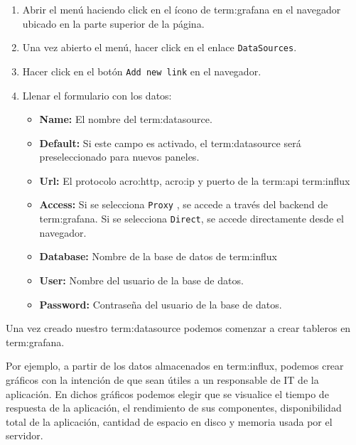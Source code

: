 \begin{enumerate}
  \item Abrir el menú haciendo click en el ícono de \gls{term:grafana} en el
  navegador ubicado en la parte superior de la página.

  \item Una vez abierto el menú, hacer click en el enlace \texttt{DataSources}.
  \item Hacer click en el botón \texttt{Add new link} en el navegador.
  \item Llenar el formulario con los datos:
    \begin{itemize}
      \item \textbf{Name:}
      El nombre del \gls{term:datasource}.

      \item \textbf{Default:}
      Si este campo es activado, el \gls{term:datasource} será preseleccionado
      para nuevos paneles.

      \item \textbf{Url:}
      El protocolo \gls{acro:http}, \gls{acro:ip} y puerto de la \gls{term:api}
      \gls{term:influx}

      \item \textbf{Access:}
      Si se selecciona \texttt{Proxy} , se accede a través del backend de \gls{term:grafana}.
      Si se selecciona \texttt{Direct}, se accede directamente desde el navegador.

      \item \textbf{Database:}
      Nombre de la base de datos de \gls{term:influx}

      \item \textbf{User:}
      Nombre del usuario de la base de datos.

      \item \textbf{Password:}
      Contraseña del usuario de la base de datos.

    \end{itemize}
\end{enumerate}

Una vez creado nuestro \gls{term:datasource} podemos comenzar a crear tableros
en \gls{term:grafana}.

Por ejemplo, a partir de los datos almacenados en \gls{term:influx}, podemos
crear gráficos con la intención de que sean útiles a un responsable de IT de la
aplicación. En dichos gráficos podemos elegir que se visualice el tiempo de
respuesta de la aplicación, el rendimiento de sus componentes, disponibilidad
total de la aplicación, cantidad de espacio en disco y memoria usada por el
servidor.

